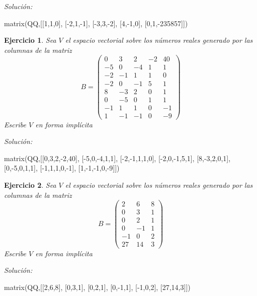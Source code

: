 \documentclass{amsart}
\newtheorem{ejer}{Ejercicio}
\begin{document}
{\it Soluci\'on:}

\begin{sageblock}
matrix(QQ,[[1,1,0],
[-2,1,-1],
[-3,3,-2],
[4,-1,0],
[0,1,-235857]])
\end{sageblock}



\begin{ejer} Sea $V$ el espacio vectorial sobre los números reales 
generado por las columnas de la matriz 
\[B = \left(\begin{array}{rrrrr}
0 & 3 & 2 & -2 & 40 \\
-5 & 0 & -4 & 1 & 1 \\
-2 & -1 & 1 & 1 & 0 \\
-2 & 0 & -1 & 5 & 1 \\
8 & -3 & 2 & 0 & 1 \\
0 & -5 & 0 & 1 & 1 \\
-1 & 1 & 1 & 0 & -1 \\
1 & -1 & -1 & 0 & -9
\end{array}\right)\]
Escribe $V$ en forma impl\'icita 
\end{ejer}

{\it Soluci\'on:}

\begin{sageblock}
matrix(QQ,[[0,3,2,-2,40],
[-5,0,-4,1,1],
[-2,-1,1,1,0],
[-2,0,-1,5,1],
[8,-3,2,0,1],
[0,-5,0,1,1],
[-1,1,1,0,-1],
[1,-1,-1,0,-9]])
\end{sageblock}



\begin{ejer} Sea $V$ el espacio vectorial sobre los números reales 
generado por las columnas de la matriz 
\[B = \left(\begin{array}{rrr}
2 & 6 & 8 \\
0 & 3 & 1 \\
0 & 2 & 1 \\
0 & -1 & 1 \\
-1 & 0 & 2 \\
27 & 14 & 3
\end{array}\right)\]
Escribe $V$ en forma impl\'icita 
\end{ejer}

{\it Soluci\'on:}

\begin{sageblock}
matrix(QQ,[[2,6,8],
[0,3,1],
[0,2,1],
[0,-1,1],
[-1,0,2],
[27,14,3]])
\end{sageblock}
\end{document}
